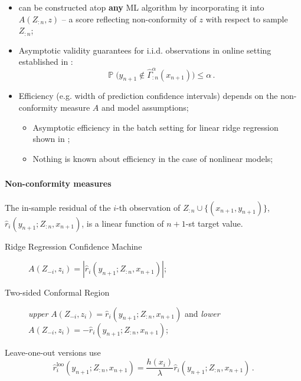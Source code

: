 \documentclass[t]{beamer}  %
\newcommand{\pr}{\mathop{\mathbb{P}}\nolimits}
\begin{document}
\begin{frame}
  \frametitle{\insertsection}
  \begin{itemize}
    \item can be constructed atop \textbf{any} ML algorithm by incorporating it into
    $A(Z_{:n}, z)$ -- a score reflecting non-conformity of $z$ with respect to sample
    $Z_{:n}$;
    \item Asymptotic validity guarantees for i.i.d. observations in online setting
    established in \cite{vovk2005}:
    $$ \pr\bigl( y_{n+1} \notin \hat{\Gamma}_{:n}^\alpha(x_{n+1}) \bigr) \leq \alpha \,. $$
    \item Efficiency (e.g. width of prediction confidence intervals) depends on the
    non-conformity measure $A$ and model assumptions; \begin{itemize}
      \item Asymptotic efficiency in the batch setting for linear ridge regression shown
      in \cite{burnaevV14};
      \item Nothing is known about efficiency in the case of nonlinear models;
    \end{itemize}
  \end{itemize}
\end{frame}

\begin{frame}[t]\frametitle{\insertsection}
  \framesubtitle{Non-conformity measures}
  The in-sample residual of the $i$-th observation of $Z_{:n}\cup\{(x_{n+1}, y_{n+1})\}$,
  $\hat{r}_i(y_{n+1}; Z_{:n}, x_{n+1})$, is a linear function of $n+1$-st target value.

  \begin{description}
    \item[Ridge Regression Confidence Machine] $A(Z_{-i}, z_i) = |\hat{r}_i(y_{n+1}; Z_{:n}, x_{n+1})|$;
    \item[Two-sided Conformal Region]
      \textit{upper} $A(Z_{-i}, z_i) = \hat{r}_i(y_{n+1}; Z_{:n}, x_{n+1})$ and
      \textit{lower} $A(Z_{-i}, z_i) = -\hat{r}_i(y_{n+1}; Z_{:n}, x_{n+1})$;
  \end{description}

  Leave-one-out versions use
  $$ \hat{r}^{\text{loo}}_i(y_{n+1}; Z_{:n}, x_{n+1})
    = \frac{h(x_i)}{\lambda} \hat{r}_i(y_{n+1}; Z_{:n}, x_{n+1}) \,. $$
\end{frame}
\end{document}
